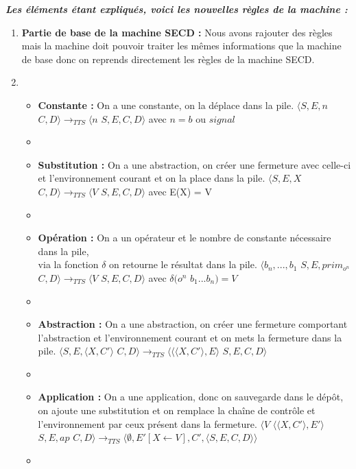 \documentclass[10pt,a4paper]{article}
\begin{document}
					
				\textbf{\textit{Les éléments étant expliqués, voici les nouvelles règles de la machine :}}
				\smallbreak
				\begin{enumerate}
					\item[] \textbf{Partie de base de la machine SECD :} Nous avons rajouter des règles mais la machine doit pouvoir traiter les mêmes informations que la machine de base donc on reprends directement les règles de la machine SECD. 
					\item[]
					\begin{itemize}
						\item[] \textbf{Constante :} On a une constante, on la déplace dans la pile.
						\smallbreak
						$\langle S,E,n$ $C,D\rangle 
						\longrightarrow_{TTS} 
						\langle n$ $S,E,C,D\rangle$ avec $n = b$ ou $signal$
						\item[]
							
						\item[] \textbf{Substitution :} On a une abstraction, on créer une fermeture avec celle-ci et l'environnement courant et on la place dans la pile.
						\smallbreak
						$\langle S,E,X$ $C,D\rangle
						\longrightarrow_{TTS} 
						\langle V$ $S,E,C,D\rangle$ avec E(X) = V
						\item[]
							
						\item[] \textbf{Opération :} On a un opérateur et le nombre de constante nécessaire dans la pile, \\via la fonction $\delta$ on retourne le résultat dans la pile.
						\smallbreak
						$\langle b_{n},...,b_{1}$ $S,E,prim_{o^{n}}$ $C,D\rangle
						\longrightarrow_{TTS} 
						\langle V$ $S,E,C,D\rangle$ avec $\delta(o^{n}$ $b_{1}...b_{n}) = V$
						\item[]
							
						\item[]  \textbf{Abstraction :} On a une abstraction, on créer une fermeture comportant l'abstraction et l'environnement courant et on mets la fermeture dans la pile.
						\smallbreak
						$\langle S,E,\langle X,C'\rangle$ $C,D\rangle
						\longrightarrow_{TTS} 
						\langle \langle\langle X,C'\rangle,E\rangle$ $S,E,C,D\rangle$
						\item[]
							
						\item[]  \textbf{Application :} On a une application, donc on sauvegarde dans le dépôt, on ajoute une substitution et on remplace la chaîne de contrôle et l'environnement par ceux présent dans la fermeture.
						\smallbreak
						$\langle V$ $\langle\langle X,C'\rangle,E'\rangle$ $S,E,ap$ $C,D\rangle
						\longrightarrow_{TTS} 
						\langle \emptyset,E'[X \leftarrow V],C',\langle S,E,C,D\rangle\rangle$
						\item[] 
							

\end{itemize}
\end{enumerate}
\end{document}
